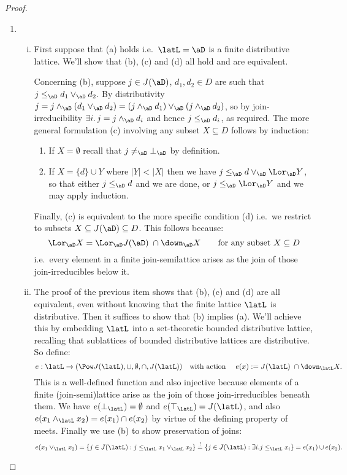 \documentclass{article}
\begin{document}
\begin{proof}
\begin{enumerate}
\item

\begin{enumerate}[(i)]
\item
First suppose that (a) holds i.e.\ $\latL = \aD$ is a finite distributive lattice. We'll show that (b), (c) and (d) all hold and are equivalent.

Concerning (b), suppose $j \in J(\aD)$, $d_1,d_2 \in D$ are such that $j \leq_\aD d_1 \lor_\aD d_2$. By distributivity $j = j \land_\aD (d_1 \lor_\aD d_2) = (j \land_\aD d_1) \lor_\aD (j \land_\aD d_2)$, so by join-irreducibility $\exists i.\, j = j \land_\aD d_i$ and hence $j \leq_\aD d_i$, as required.  The more general formulation (c) involving any subset $X \subseteq D$ follows by induction:
\begin{enumerate}
\item
If $X = \emptyset$ recall that $j \neq_\aD \bot_\aD$ by definition.
\item
If $X = \{d\} \cup Y$ where $|Y| < |X|$ then we have $j \leq_\aD d \lor_\aD \Lor_\aD Y$, so that either $j \leq_\aD d$ and we are done, or $j \leq_\aD \Lor_\aD Y$ and we may apply induction.
\end{enumerate}

Finally, (c) is equivalent to the more specific condition (d) i.e.\  we restrict to subsets $X \subseteq J(\aD) \subseteq D$. This follows because:
\[
\Lor_\aD X = \Lor_\aD J(\aD) \; \cap \down_\aD X
\qquad
\text{for any subset $X \subseteq D$}
\]
i.e.\ every element in a finite join-semilattice arises as the join of those join-irreducibles below it.

\item
The proof of the previous item shows that (b), (c) and (d) are all equivalent, even without knowing that the finite lattice $\latL$ is distributive. Then it suffices to show that (b) implies (a). We'll achieve this by embedding $\latL$ into a set-theoretic bounded distributive lattice, recalling that sublattices of bounded distributive lattices are distributive. So define:
\[
e : \latL \to (\Pow J(\latL),\cup,\emptyset,\cap,J(\latL))
\text{\quad with action \quad}
e(x) :=  J(\latL) \; \cap \down_\latL X.
\]
This is a well-defined function and also injective because elements of a finite (join-semi)lattice arise as the join of those join-irreducibles beneath them. We  have $e(\bot_\latL) = \emptyset$ and $e(\top_\latL) = J(\latL)$, and also $e(x_1 \land_\latL x_2) = e(x_1) \cap e(x_2)$ by virtue of the defining property of meets. Finally we use (b) to show preservation of joins:
\[
e(x_1 \lor_\latL x_2)
= \{ j \in J(\latL) : j \leq_\latL x_1 \lor_\latL x_2 \}
\stackrel{!}{=} \{ j \in J(\latL) : \exists i. j \leq_\latL x_i \}
= e(x_1) \cup e(x_2).
\]


\end{enumerate}
\end{enumerate}
\end{proof}
\end{document}
